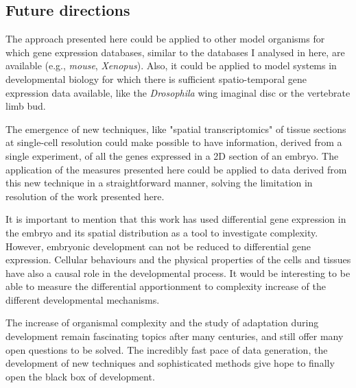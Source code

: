 

\subsection*{Future directions}

The approach presented here could be applied to other model organisms for which gene expression databases, similar to the databases I analysed in here, are available (e.g., \textit{mouse}, \textit{Xenopus}). Also, it could be applied to model systems in developmental biology for which there is sufficient spatio-temporal gene expression data available, like the \textit{Drosophila} wing imaginal disc or the vertebrate limb bud.

The emergence of new techniques, like "spatial transcriptomics" of tissue sections at single-cell resolution \citep{Stahl2016} could make possible to have information, derived from a single experiment, of all the genes expressed in a 2D section of an embryo. The application of the measures presented here could be applied to data derived from this new technique in a straightforward manner, solving the limitation in resolution of the work presented here.

It is important to mention that this work has used differential gene expression in the embryo and its spatial distribution as a tool to investigate complexity. However, embryonic development can not be reduced to differential gene expression. Cellular behaviours and the physical properties of the cells and tissues have also a causal role in the developmental process. It would be interesting to be able to measure the differential apportionment to complexity increase of the different developmental mechanisms.

The increase of organismal complexity and the study of adaptation during development remain fascinating topics after many centuries, and still offer many open questions to be solved. The incredibly fast pace of data generation, the development of new techniques and sophisticated methods give hope to finally open the black box of development.

